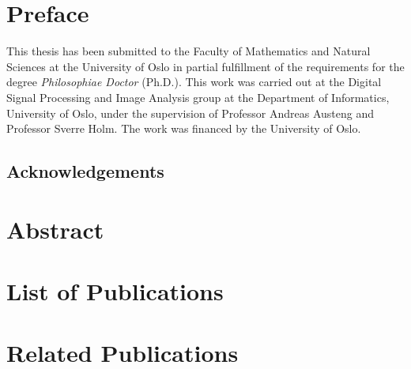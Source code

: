 
\endofdump

\ifRootBuild\else
  
  \makeglossaries
\fi




\chapter*{Preface}

This thesis has been submitted to the Faculty of Mathematics and Natural Sciences at the University of Oslo in partial fulfillment of the requirements for the degree \emph{Philosophiae Doctor} (Ph.D.). This work was carried out at the Digital Signal Processing and Image Analysis group at the Department of Informatics, University of Oslo, under the supervision of Professor Andreas Austeng and Professor Sverre Holm. The work was financed by the University of Oslo.

\section*{Acknowledgements}


\newpage
\chapter*{Abstract}

\newpage
\chapter*{List of Publications}

\newpage
\chapter*{Related Publications}


